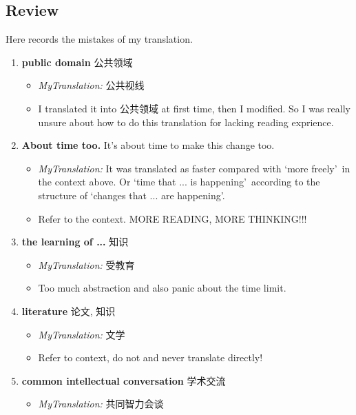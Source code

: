 \documentclass[a4paper, 12pt, UTF8]{article}
\begin{document}
\subsection{Review}
Here records the mistakes of my translation.
\begin{enumerate}[\hspace{0.5cm} 1.]
    \item {\bfseries public domain} 公共领域
          \begin{itemize}
              \item \emph{MyTranslation:} 公共视线
              \item I translated it into 公共领域 at first time, then I modified. So I was really unsure about how to do this translation for lacking reading exprience. 
          \end{itemize}
    \item {\bfseries About time too.} It's about time to make this change too.
          \begin{itemize}
              \item \emph{MyTranslation:} It was translated as faster compared with \lq more freely\rq\ in the context above. Or \lq time that ... is happening\rq\ according to the structure of \lq changes that ... are happening\rq.
              \item Refer to the context. MORE READING, MORE THINKING!!! 
          \end{itemize}
    \item {\bfseries the learning of ...} 知识
          \begin{itemize}
              \item \emph{MyTranslation:} 受教育
              \item Too much abstraction and also panic about the time limit.
          \end{itemize}
    \item {\bfseries literature} 论文, 知识
          \begin{itemize}
              \item \emph{MyTranslation:} 文学
              \item Refer to context, do not and never translate directly!
          \end{itemize}
    \item {\bfseries common intellectual conversation} 学术交流
          \begin{itemize}
              \item \emph{MyTranslation:} 共同智力会谈 

\end{itemize}
\end{enumerate}
\end{document}
